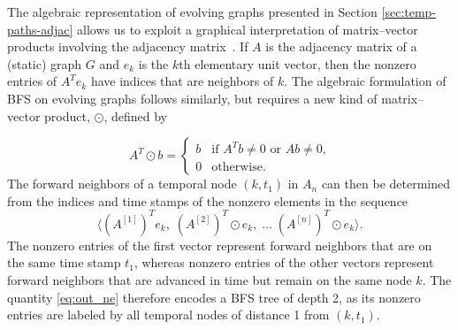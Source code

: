 \documentclass[10pt,conference,compsocconf]{IEEEtran}
\theoremstyle{definition}
\begin{document}
The algebraic representation of evolving graphs presented in Section \ref{sec:temp-paths-adjac}
allows us to exploit a graphical interpretation of
matrix--vector products involving the adjacency matrix~\cite{kegi11}.
If $A$ is the adjacency matrix of a (static) graph $G$ and $e_k$ is the $k$th
elementary unit vector, then the nonzero entries of $A^T e_k$ have indices that
are neighbors of $k$.
The algebraic formulation of BFS on evolving graphs follows similarly, but
requires a new kind of matrix--vector product, $\odot$, defined by

\[
A^T \!\odot b =
\begin{cases}
b & \mbox{if $A^Tb \ne 0$ or $Ab \ne 0$,} \\
0 & \mbox{otherwise.}
\end{cases}
\]
The forward neighbors of a temporal node $(k, t_1)$ in $A_n$ can then be determined
from the indices and time stamps of the nonzero elements in the sequence
\begin{equation}
\label{eq:out_ne}
\big\langle (A^{[1]})^Te_k, \; (A^{[2]})^T\!\odot e_k, \; \ldots \; (A^{[n]})^T\!\odot e_k\big\rangle.
\end{equation}
The nonzero entries of the first vector represent forward neighbors that are on
the same time stamp $t_1$, whereas nonzero entries of the other vectors represent forward
neighbors that are advanced in time but remain on the same node $k$.
The quantity \eqref{eq:out_ne} therefore encodes a BFS tree of depth 2,
as its nonzero entries are labeled by all temporal nodes of distance 1 from
$(k, t_1)$.
\end{document}
